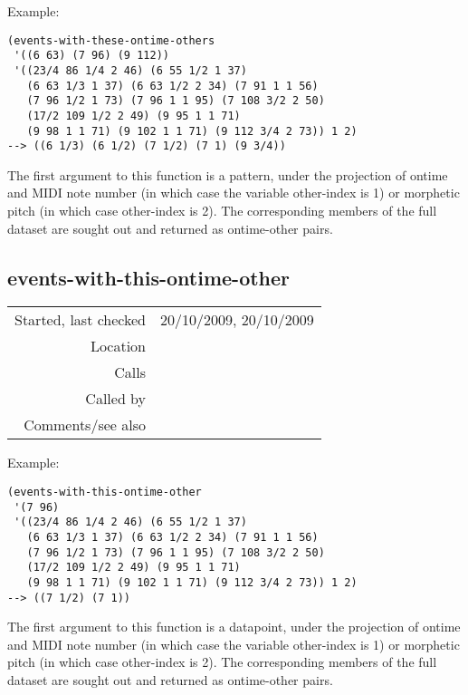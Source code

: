 \vspace{0.5cm}
\noindent Example:
\begin{verbatim}
(events-with-these-ontime-others
 '((6 63) (7 96) (9 112))
 '((23/4 86 1/4 2 46) (6 55 1/2 1 37)
   (6 63 1/3 1 37) (6 63 1/2 2 34) (7 91 1 1 56)
   (7 96 1/2 1 73) (7 96 1 1 95) (7 108 3/2 2 50)
   (17/2 109 1/2 2 49) (9 95 1 1 71)
   (9 98 1 1 71) (9 102 1 1 71) (9 112 3/4 2 73)) 1 2)
--> ((6 1/3) (6 1/2) (7 1/2) (7 1) (9 3/4))
\end{verbatim}

\noindent The first argument to this function is a
pattern, under the projection of ontime and MIDI note
number (in which case the variable other-index is 1)
or morphetic pitch (in which case other-index is 2).
The corresponding members of the full dataset are
sought out and returned as ontime-other pairs.


\subsection*{events-with-this-ontime-other}\label{fun:events-with-this-ontime-other}

\vspace{0.3cm}
\begin{tabular}{r|p{8cm}}
Started, last checked & 20/10/2009, 20/10/2009 \\
Location & \nameref{sec:empirical-preliminaries} \\
Calls & \\
Called by & \nameref{fun:events-with-these-ontime-others} \\
Comments/see also &
\end{tabular}

\vspace{0.5cm}
\noindent Example:
\begin{verbatim}
(events-with-this-ontime-other
 '(7 96)
 '((23/4 86 1/4 2 46) (6 55 1/2 1 37)
   (6 63 1/3 1 37) (6 63 1/2 2 34) (7 91 1 1 56)
   (7 96 1/2 1 73) (7 96 1 1 95) (7 108 3/2 2 50)
   (17/2 109 1/2 2 49) (9 95 1 1 71)
   (9 98 1 1 71) (9 102 1 1 71) (9 112 3/4 2 73)) 1 2)
--> ((7 1/2) (7 1))
\end{verbatim}

\noindent The first argument to this function is a
datapoint, under the projection of ontime and MIDI
note number (in which case the variable other-index is
1) or morphetic pitch (in which case other-index is
2). The corresponding members of the full dataset are
sought out and returned as ontime-other pairs.


